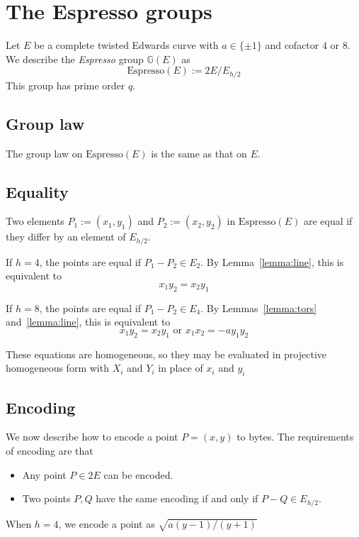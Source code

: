 \documentclass[11pt]{article}
\def\G{\ensuremath{\mathbb{G}}}
\begin{document}
\section{The Espresso groups}
Let $E$ be a complete twisted Edwards curve with $a\in\{\pm1\}$ and cofactor $4$ or $8$. We describe the \textit{Espresso} group $\G(E)$ as
$$\text{Espresso}(E) := 2E / E_{h/2}$$
This group has prime order $q$.
\subsection{Group law}
The group law on $\text{Espresso}(E)$ is the same as that on $E$.
\subsection{Equality}
Two elements $P_1 := (x_1,y_1)$ and $P_2 := (x_2,y_2)$ in $\text{Espresso}(E)$ are equal if they differ by an element of $E_{h/2}$.

If $h=4$, the points are equal if $P_1-P_2\in E_2$.  By Lemma~\ref{lemma:line}, this is equivalent to $$x_1 y_2 = x_2 y_1$$

If $h=8$, the points are equal if $P_1-P_2\in E_4$.  By Lemmas~\ref{lemma:tors} and~\ref{lemma:line}, this is equivalent to $$x_1 y_2 = x_2 y_1\text{\ \ or\ \ }x_1 x_2 = -a y_1 y_2$$

These equations are homogeneous, so they may be evaluated in projective homogeneous form with $X_i$ and $Y_i$ in place of $x_i$ and $y_i$

\subsection{Encoding}
We now describe how to encode a point $P = (x,y)$ to bytes.  The requirements of encoding are that
\begin{itemize}
\item Any point $P\in2E$ can be encoded.
\item Two points $P,Q$ have the same encoding if and only if $P-Q\in E_{h/2}$.
\end{itemize}

When $h=4$, we encode a point as $\sqrt{a(y-1)/(y+1)}$
\end{document}
